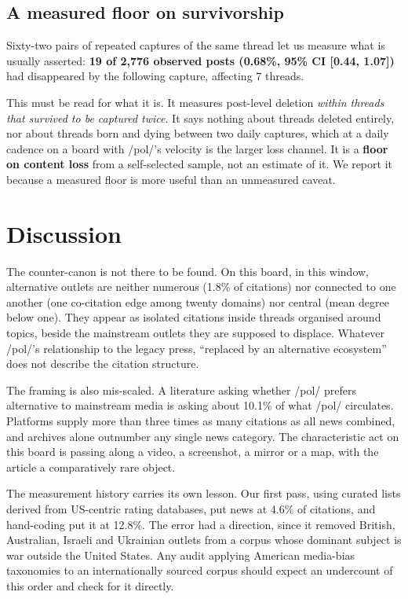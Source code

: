 \documentclass[11pt]{article}
\begin{document}
\subsection{A measured floor on survivorship}
\label{sec:deletion}

Sixty-two pairs of repeated captures of the same thread let us measure what is
usually asserted: \textbf{19 of 2{,}776 observed posts (0.68\%, 95\% CI
[0.44, 1.07])} had disappeared by the following capture, affecting 7 threads.

This must be read for what it is. It measures post-level deletion \emph{within
threads that survived to be captured twice}. It says nothing about threads
deleted entirely, nor about threads born and dying between two daily
captures, which at a daily cadence on a board with /pol/'s velocity is the
larger loss channel. It is a \textbf{floor on content loss} from a self-selected
sample, not an estimate of it. We report it because a measured floor is more
useful than an unmeasured caveat.

\section{Discussion}

The counter-canon is not there to be found. On this board, in this window,
alternative outlets are neither numerous (1.8\% of citations) nor connected to
one another (one co-citation edge among twenty domains) nor central (mean degree
below one). They appear as isolated citations inside threads organised around
topics, beside the mainstream outlets they are supposed to displace. Whatever
/pol/'s relationship to the legacy press, ``replaced by an alternative
ecosystem'' does not describe the citation structure.

The framing is also mis-scaled. A literature asking whether /pol/ prefers
alternative to mainstream media is asking about 10.1\% of what /pol/ circulates.
Platforms supply more than three times as many citations as all news combined,
and archives alone outnumber any single news category. The characteristic act on
this board is passing along a video, a screenshot, a mirror or a map, with the
article a comparatively rare object.

The measurement history carries its own lesson. Our first pass, using curated
lists derived from US-centric rating databases, put news at 4.6\% of citations,
and hand-coding put it at 12.8\%. The error had a direction, since it removed
British, Australian, Israeli and Ukrainian outlets from a corpus whose dominant
subject is war outside the United States. Any audit applying American media-bias
taxonomies to an internationally sourced corpus should expect an undercount of
this order and check for it directly.
\end{document}
